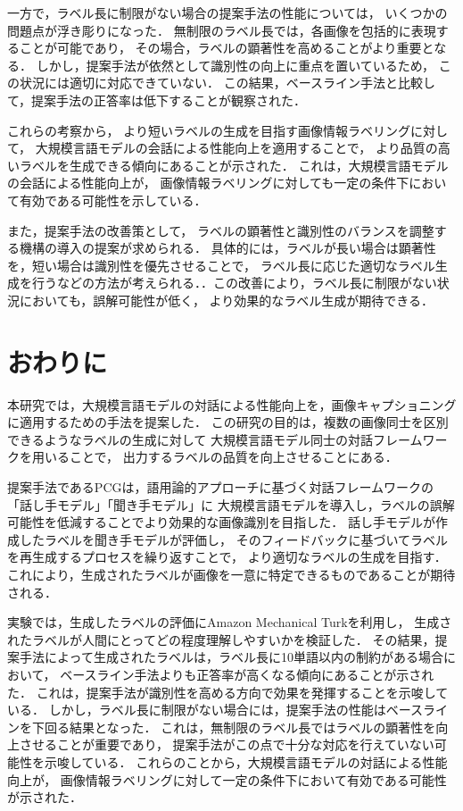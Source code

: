\documentclass[a4paper,11pt]{jreport}
\begin{document}
一方で，ラベル長に制限がない場合の提案手法の性能については，
いくつかの問題点が浮き彫りになった．
無制限のラベル長では，各画像を包括的に表現することが可能であり，
その場合，ラベルの顕著性を高めることがより重要となる．
しかし，提案手法が依然として識別性の向上に重点を置いているため，
この状況には適切に対応できていない．
この結果，ベースライン手法と比較して，提案手法の正答率は低下することが観察された．

これらの考察から，
より短いラベルの生成を目指す画像情報ラベリングに対して，
大規模言語モデルの会話による性能向上を適用することで，
より品質の高いラベルを生成できる傾向にあることが示された．
これは，大規模言語モデルの会話による性能向上が，
画像情報ラベリングに対しても一定の条件下において有効である可能性を示している．

また，提案手法の改善策として，
ラベルの顕著性と識別性のバランスを調整する機構の導入の提案が求められる．
具体的には，ラベルが長い場合は顕著性を，短い場合は識別性を優先させることで，
ラベル長に応じた適切なラベル生成を行うなどの方法が考えられる．．この改善により，ラベル長に制限がない状況においても，誤解可能性が低く，
より効果的なラベル生成が期待できる．

\chapter{おわりに}

本研究では，大規模言語モデルの対話による性能向上を，画像キャプショニングに適用するための手法を提案した．
この研究の目的は，複数の画像同士を区別できるようなラベルの生成に対して
大規模言語モデル同士の対話フレームワークを用いることで，
出力するラベルの品質を向上させることにある．

提案手法であるPCGは，語用論的アプローチに基づく対話フレームワークの「話し手モデル」「聞き手モデル」に
大規模言語モデルを導入し，ラベルの誤解可能性を低減することでより効果的な画像識別を目指した．
話し手モデルが作成したラベルを聞き手モデルが評価し，
そのフィードバックに基づいてラベルを再生成するプロセスを繰り返すことで，
より適切なラベルの生成を目指す．
これにより，生成されたラベルが画像を一意に特定できるものであることが期待される．

実験では，生成したラベルの評価にAmazon Mechanical Turkを利用し，
生成されたラベルが人間にとってどの程度理解しやすいかを検証した．
その結果，提案手法によって生成されたラベルは，ラベル長に10単語以内の制約がある場合において，
ベースライン手法よりも正答率が高くなる傾向にあることが示された．
これは，提案手法が識別性を高める方向で効果を発揮することを示唆している．
しかし，ラベル長に制限がない場合には，提案手法の性能はベースラインを下回る結果となった．
これは，無制限のラベル長ではラベルの顕著性を向上させることが重要であり，
提案手法がこの点で十分な対応を行えていない可能性を示唆している．
これらのことから，大規模言語モデルの対話による性能向上が，
画像情報ラベリングに対して一定の条件下において有効である可能性が示された．
\end{document}
